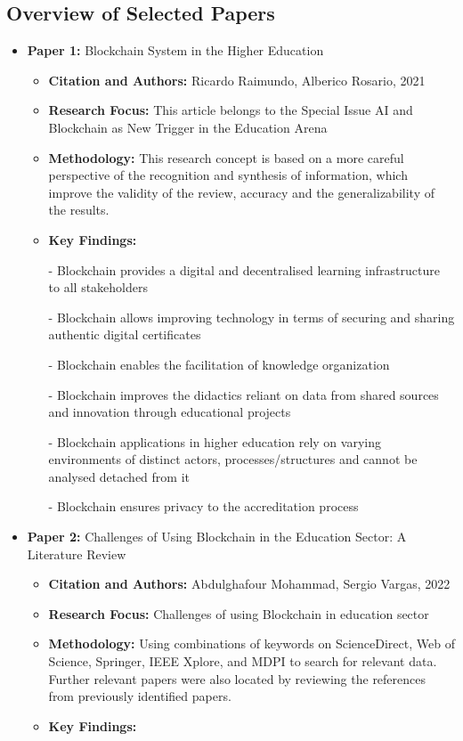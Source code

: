\documentclass[12pt,a4paper]{article}
\begin{document}
\subsection{Overview of Selected Papers}
\begin{itemize}
    \item \textbf{Paper 1:} Blockchain System in the Higher Education 
    \begin{itemize}
        \item \textbf{Citation and Authors:} Ricardo Raimundo, Alberico Rosario, 2021 \cite{p1}
        \item \textbf{Research Focus:} This article belongs to the Special Issue AI and Blockchain as New Trigger in the Education Arena 
        \item \textbf{Methodology:} This research concept is based on a more careful perspective of the recognition and synthesis of information, which improve the validity of the review, accuracy and the generalizability of the results.
        \item \textbf{Key Findings:} 
        
         - Blockchain provides a digital and decentralised learning 
           infrastructure to all stakeholders 
           
         - Blockchain allows improving technology in terms of securing and 
           sharing authentic digital certificates
           
         - Blockchain enables the facilitation of knowledge organization
         
         - Blockchain improves the didactics reliant on data from shared 
           sources and innovation through educational projects
           
         - Blockchain applications in higher education rely on varying 
           environments of distinct actors, processes/structures and cannot 
           be analysed detached from it
           
         - Blockchain ensures privacy to the accreditation process
    \end{itemize}
    \vspace{0.2cm}
    \item \textbf{Paper 2:} Challenges of Using Blockchain in the Education Sector: A Literature Review 
    \begin{itemize}
        \item \textbf{Citation and Authors:} Abdulghafour Mohammad, Sergio Vargas, 2022 \cite{p2}
        \item \textbf{Research Focus:} Challenges of using Blockchain in education sector
        \item \textbf{Methodology:} Using combinations of keywords on ScienceDirect, Web of Science, Springer, IEEE Xplore, and MDPI to search for relevant data. Further relevant papers were also located by reviewing the references from previously identified papers.
        \item \textbf{Key Findings:} 
        

\end{itemize}
\end{itemize}
\end{document}

